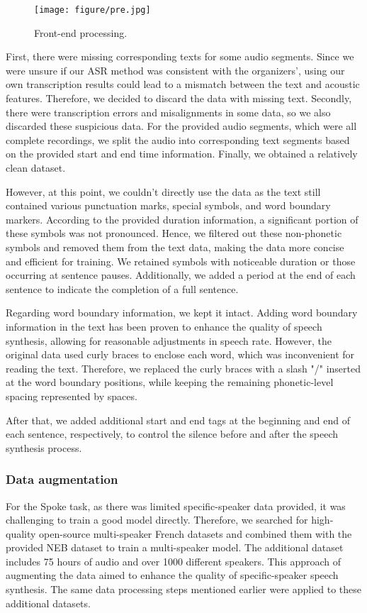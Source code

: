 \documentclass{INTERSPEECH2023}
\begin{document}
\begin{figure}[h]
  \centering
  \texttt{[image: figure/pre.jpg]}
  \caption{Front-end processing.}
  \label{Front-end-processing}
\end{figure}

First, there were missing corresponding texts for some audio segments. Since we were unsure if our ASR method was consistent with the organizers', using our own transcription results could lead to a mismatch between the text and acoustic features. Therefore, we decided to discard the data with missing text. Secondly, there were transcription errors and misalignments in some data, so we also discarded these suspicious data. For the provided audio segments, which were all complete recordings, we split the audio into corresponding text segments based on the provided start and end time information. Finally, we obtained a relatively clean dataset.

However, at this point, we couldn't directly use the data as the text still contained various punctuation marks, special symbols, and word boundary markers. According to the provided duration information, a significant portion of these symbols was not pronounced. Hence, we filtered out these non-phonetic symbols and removed them from the text data, making the data more concise and efficient for training. We retained symbols with noticeable duration or those occurring at sentence pauses. Additionally, we added a period at the end of each sentence to indicate the completion of a full sentence.

Regarding word boundary information, we kept it intact. Adding word boundary information in the text has been proven to enhance the quality of speech synthesis, allowing for reasonable adjustments in speech rate. However, the original data used curly braces to enclose each word, which was inconvenient for reading the text. Therefore, we replaced the curly braces with a slash "/" inserted at the word boundary positions, while keeping the remaining phonetic-level spacing represented by spaces.

After that, we added additional start and end tags at the beginning and end of each sentence, respectively, to control the silence before and after the speech synthesis process.


\subsubsection{Data augmentation}
For the Spoke task, as there was limited specific-speaker data provided, it was challenging to train a good model directly. Therefore, we searched for high-quality open-source multi-speaker French datasets \cite{CommonVoice} and combined them with the provided NEB dataset to train a multi-speaker model. The additional dataset includes 75 hours of audio and over 1000 different speakers. This approach of augmenting the data aimed to enhance the quality of specific-speaker speech synthesis. The same data processing steps mentioned earlier were applied to these additional datasets.
\end{document}

